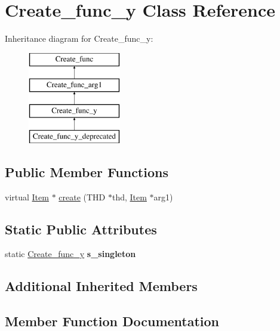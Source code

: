 \hypertarget{classCreate__func__y}{}\section{Create\+\_\+func\+\_\+y Class Reference}
\label{classCreate__func__y}
Inheritance diagram for Create\+\_\+func\+\_\+y\+:\begin{figure}[H]
\begin{center}
\leavevmode
\includegraphics[height=4.000000cm]{classCreate__func__y}
\end{center}
\end{figure}
\subsection*{Public Member Functions}
\begin{DoxyCompactItemize}
\item 
virtual \mbox{\hyperlink{classItem}{Item}} $\ast$ \mbox{\hyperlink{classCreate__func__y_a2b7dc1551bdf7d0a6cb804c1aef910f7}{create}} (T\+HD $\ast$thd, \mbox{\hyperlink{classItem}{Item}} $\ast$arg1)
\end{DoxyCompactItemize}
\subsection*{Static Public Attributes}
\begin{DoxyCompactItemize}
\item 
\mbox{\label{classCreate__func__y_ae6fa09ae97f16bc05c21696790416117}} 
static \mbox{\hyperlink{classCreate__func__y}{Create\+\_\+func\+\_\+y}} {\bfseries s\+\_\+singleton}
\end{DoxyCompactItemize}
\subsection*{Additional Inherited Members}


\subsection{Member Function Documentation}
\mbox{\label{classCreate__func__y_a2b7dc1551bdf7d0a6cb804c1aef910f7}} 
